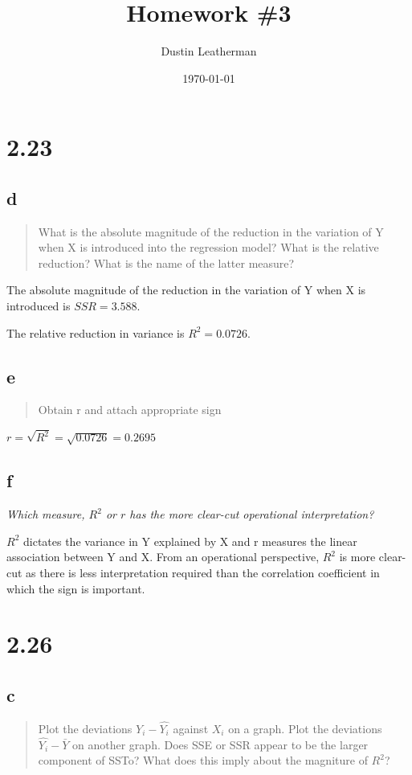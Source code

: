 \documentclass[11pt]{article}
\author{Dustin Leatherman}
\date{\today}
\title{Homework \#3}
\begin{document}
\maketitle
\tableofcontents


\section{2.23}
\label{sec:org2092d84}
\subsection{d}
\label{sec:orge48f418}
\begin{quote}
What is the absolute magnitude of the reduction in the variation of Y when X is
introduced into the regression model? What is the relative reduction? What is
the name of the latter measure?
\end{quote}

The absolute magnitude of the reduction in the variation of Y when X is
introduced is \(SSR = 3.588\).

The relative reduction in variance is \(R^2 = 0.0726\).
\subsection{e}
\label{sec:org6a14bd1}
\begin{quote}
Obtain r and attach appropriate sign
\end{quote}


\(r = \sqrt{R^2} = \sqrt{0.0726} = 0.2695\)
\subsection{f}
\label{sec:orgc1f08cf}
\emph{Which measure, \(R^2\) or \(r\) has the more clear-cut operational interpretation?}

\(R^2\) dictates the variance in Y explained by X and r measures the linear
association between Y and X. From an operational perspective, \(R^2\) is more
clear-cut as there is less interpretation required than the correlation
coefficient in which the sign is important.
\section{2.26}
\label{sec:org738deaa}
\subsection{c}
\label{sec:orge5d0a1e}
\begin{quote}
Plot the deviations \(Y_i - \hat{Y_i}\) against \(X_i\) on a graph. Plot the
deviations \(\hat{Y_i} - \bar{Y}\) on another graph. Does SSE or SSR appear to be
the larger component of SSTo? What does this imply about the magniture of
\(R^2\)?
\end{quote}
\end{document}
